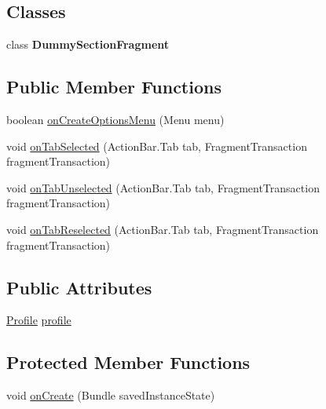\subsection*{Classes}
\begin{DoxyCompactItemize}
\item 
class {\bfseries Dummy\-Section\-Fragment}
\end{DoxyCompactItemize}
\subsection*{Public Member Functions}
\begin{DoxyCompactItemize}
\item 
boolean \hyperlink{classcom_1_1example_1_1workoutcompanion_1_1_workout_activity_ae06438356b251373878b8355e48dbeeb}{on\-Create\-Options\-Menu} (Menu menu)
\item 
void \hyperlink{classcom_1_1example_1_1workoutcompanion_1_1_workout_activity_a058429dd9b85af3a68938d753caaaed0}{on\-Tab\-Selected} (Action\-Bar.\-Tab tab, Fragment\-Transaction fragment\-Transaction)
\item 
void \hyperlink{classcom_1_1example_1_1workoutcompanion_1_1_workout_activity_a59bf7cbca8c0dc7d29df3633facce3e7}{on\-Tab\-Unselected} (Action\-Bar.\-Tab tab, Fragment\-Transaction fragment\-Transaction)
\item 
void \hyperlink{classcom_1_1example_1_1workoutcompanion_1_1_workout_activity_a030d02894f9f27ddbfc318e8ffbbedef}{on\-Tab\-Reselected} (Action\-Bar.\-Tab tab, Fragment\-Transaction fragment\-Transaction)
\end{DoxyCompactItemize}
\subsection*{Public Attributes}
\begin{DoxyCompactItemize}
\item 
\hyperlink{classcom_1_1example_1_1workoutcompanion_1_1dom_1_1_profile}{Profile} \hyperlink{classcom_1_1example_1_1workoutcompanion_1_1_workout_activity_a869892c117ac8470219446dfba839688}{profile}
\end{DoxyCompactItemize}
\subsection*{Protected Member Functions}
\begin{DoxyCompactItemize}
\item 
void \hyperlink{classcom_1_1example_1_1workoutcompanion_1_1_workout_activity_ae63e0efa8659a02d91e8db8332a77c24}{on\-Create} (Bundle saved\-Instance\-State)
\end{DoxyCompactItemize}


